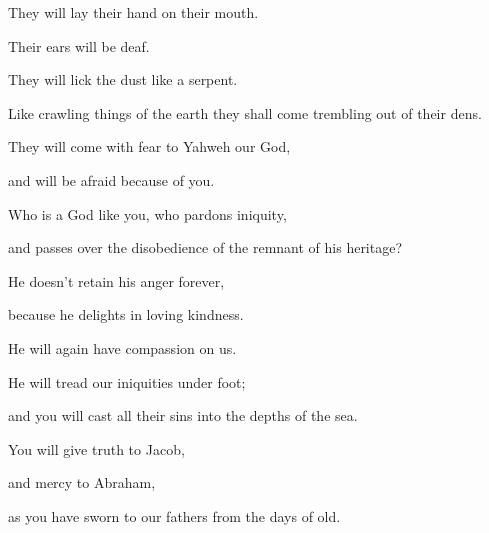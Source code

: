 {\par }{\QB They will lay their hand on their mouth.
\par }{\QB Their ears will be deaf.
\par }{\Q {}They will lick the dust like a serpent.
\par }{\QB Like crawling things of the earth they shall come trembling out of their dens.
\par }{\QB They will come with fear to Yahweh our God,
\par }{\QB and will be afraid because of you.
\par }{\Q {}Who is a God like you, who pardons iniquity,
\par }{\QB and passes over the disobedience of the remnant of his heritage?
\par }{\Q He doesn’t retain his anger forever,
\par }{\QB because he delights in loving kindness.
\par }{\Q {}He will again have compassion on us.
\par }{\QB He will tread our iniquities under foot;
\par }{\QB and you will cast all their sins into the depths of the sea.
\par }{\Q {}You will give truth to Jacob,
\par }{\QB and mercy to Abraham,
\par }{\QB as you have sworn to our fathers from the days of old.
\par }
